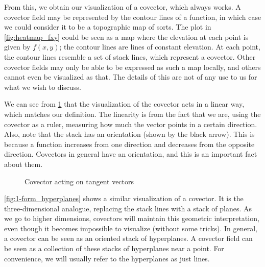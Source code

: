 \documentclass[a4paper,12pt]{article}
\begin{document}
From this, we obtain our visualization of a covector, which always works.
A covector field may be represented by the contour lines of a function, in which case we could consider it to be a topographic map of sorts.
The plot in \cref{fig:heatmap_fxy} could be seen as a map where the elevation at each point is given by $f(x,y)$; the contour lines are lines of constant elevation.
At each point, the contour lines resemble a set of stack lines, which represent a covector.
Other covector fields may only be able to be expressed as such a map locally, and others cannot even be visualized as that.
The details of this are not of any use to us for what we wish to discuss.

We can see from \cref{fig:parallel_stack_lines} that the visualization of the covector acts in a linear way, which matches our definition.
The linearity is from the fact that we are, using the covector as a ruler, measuring how much the vector points in a certain direction.
Also, note that the stack has an orientation (shown by the black arrow).
This is because a function increases from one direction and decreases from the opposite direction.
Covectors in general have an orientation, and this is an important fact about them.

\begin{figure}[!htbp]
\centering
{}
\caption{Covector acting on tangent vectors}
\label{fig:parallel_stack_lines}
\end{figure}

\cref{fig:1-form_hyperplanes} shows a similar visualization of a covector.
It is the three-dimensional analogue, replacing the stack lines with a stack of planes.
As we go to higher dimensions, covectors will maintain this geometric interpretation, even though it becomes impossible to visualize (without some tricks).
In general, a covector can be seen as an oriented stack of hyperplanes.
A covector field can be seen as a collection of these stacks of hyperplanes near a point.
For convenience, we will usually refer to the hyperplanes as just lines.
\end{document}

